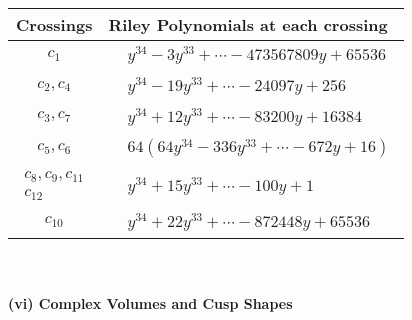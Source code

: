 \documentclass[1p]{elsarticle_modified}
\theoremstyle{definition}
\begin{document}
\begin{tabular}{m{50pt}|m{274pt}}
Crossings & \hspace{64pt}Riley Polynomials at each crossing \\
\hline $$\begin{aligned}c_{1}\end{aligned}$$&$\begin{aligned}
&y^{34}-3 y^{33}+\cdots-473567809 y+65536
\end{aligned}$\\
\hline $$\begin{aligned}c_{2},c_{4}\end{aligned}$$&$\begin{aligned}
&y^{34}-19 y^{33}+\cdots-24097 y+256
\end{aligned}$\\
\hline $$\begin{aligned}c_{3},c_{7}\end{aligned}$$&$\begin{aligned}
&y^{34}+12 y^{33}+\cdots-83200 y+16384
\end{aligned}$\\
\hline $$\begin{aligned}c_{5},c_{6}\end{aligned}$$&$\begin{aligned}
&64(64 y^{34}-336 y^{33}+\cdots-672 y+16)
\end{aligned}$\\
\hline $$\begin{aligned}c_{8},c_{9},c_{11}\\c_{12}\end{aligned}$$&$\begin{aligned}
&y^{34}+15 y^{33}+\cdots-100 y+1
\end{aligned}$\\
\hline $$\begin{aligned}c_{10}\end{aligned}$$&$\begin{aligned}
&y^{34}+22 y^{33}+\cdots-872448 y+65536
\end{aligned}$\\
\hline
\end{tabular}\\~\\
\newpage\flushleft \textbf{(vi) Complex Volumes and Cusp Shapes}
\end{document}
